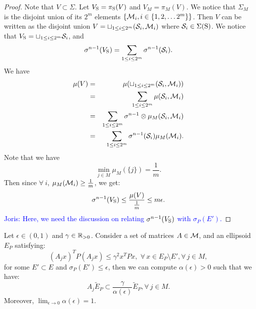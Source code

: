 \begin{proof}
Note that $V \subset \Sigma$. Let $V_{\text{S}} = \pi_{\text{S}}(V)$ and $V_M = \pi_M (V)$. We notice that $\Sigma_M$ is the disjoint union of its $2^m$ elements $\{\mathcal{M}_i, i \in \{1,2, \ldots 2^m\} \}$. Then $V$ can be written as the disjoint union $V = \sqcup_{1 \leq i \leq 2^m} (\mathcal{S}_i, \mathcal{M}_i)$ where $\mathcal{S}_i \in \Sigma(\text{S})$. We notice that 
$V_{\text{S}} = \sqcup_{1 \leq i \leq 2^m} \mathcal{S}_i$, 
and
\begin{equation*}
\sigma^{n-1} (V_{\text{S}}) = \sum_{1 \leq i \leq 2^m} \sigma^{n-1} (\mathcal{S}_i).
\end{equation*}
We have 
\begin{eqnarray*}
\mu(V) &=& \mu(\sqcup_{1 \leq i \leq 2^m} (\mathcal{S}_i, \mathcal{M}_i)) \\
&=& \sum_{1 \leq i \leq 2^m} \mu(\mathcal{S}_i, \mathcal{M}_i) \\
 &=& \sum_{1 \leq i \leq 2^m} \sigma^{n-1} \otimes \mu_M (\mathcal{S}_i, \mathcal{M}_i) \\
 & = &\sum_{1 \leq i \leq 2^m} \sigma^{n-1}(\mathcal{S}_i) \mu_M (\mathcal{M}_i).
\end{eqnarray*}
Note that we have $$\min_{j \in M} \mu_M(\{j\}) = \frac{1}{m}.$$ Then since $ \forall \ i$, $\mu_M(\mathcal{M}_i) \geq \frac{1}{m}$, we get:
\begin{equation}
\sigma^{n-1}(V_{\text{S}}) \leq \frac{\mu(V)}{\frac{1}{m}} \leq m \epsilon.
\end{equation}
\textcolor{blue}{Joris: Here, we need the discussion on relating $\sigma^{n-1}(V_{\text{S}})$ with $\sigma_P(E')$.}
\end{proof}

\begin{theorem}\label{thm:mainTheorem1}Let $\epsilon \in (0,1)$ and $\gamma \in \mathbb{R}_{> 0}$. Consider a set of matrices $A \in \mathcal{M}$, and an ellipsoid $E_P$ satisfying:
\begin{equation}(A_j x)^TP(A_j x) \leq \gamma^2x^TPx,\,\, \forall\, x \in E_P \setminus E', \forall\, j \in M, \end{equation}
for some $E' \subset E$ and $\sigma_P(E') \leq \epsilon$, then we can compute $\alpha(\epsilon) > 0$ such that we have:
\begin{equation}\label{eqn:contractionEllipsoid}A_j \tilde{E}_P \subset \frac{\gamma}{\alpha(\epsilon)}\tilde{E}_P, \forall\, j \in M.
\end{equation}
Moreover, $\lim_{\epsilon \to 0} \alpha(\epsilon) = 1$.
\end{theorem}

